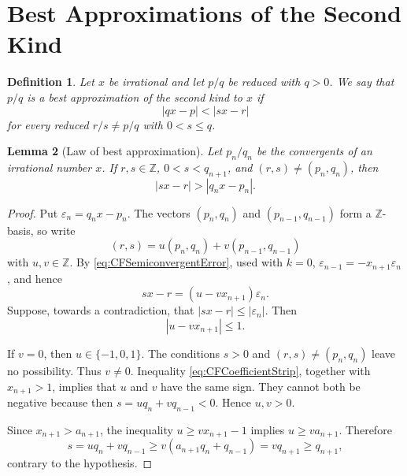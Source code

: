 \documentclass{book}
\newtheorem{definition}{Definition}[section]
\newtheorem{lemma}[definition]{Lemma}
\begin{document}
\section{Best Approximations of the Second Kind}

\begin{definition}
  Let \(x\) be irrational and let \(p/q\) be reduced with \(q>0\). We say
  that \(p/q\) is a \textnormal{best approximation of the second kind} to
  \(x\) if
  \[
    |qx-p|<|sx-r|
  \]
  for every reduced \(r/s\neq p/q\) with \(0<s\leq q\).
\end{definition}

\begin{lemma}[Law of best approximation]\label{lem:CFLawBestApproximation}
  Let \(p_n/q_n\) be the convergents of an irrational number \(x\). If
  \(r,s\in\mathbb Z\), \(0<s<q_{n+1}\), and
  \((r,s)\neq(p_n,q_n)\), then
  \begin{equation}\label{eq:CFLawBestApproximation}
    |sx-r|>|q_nx-p_n|.
  \end{equation}
\end{lemma}

\begin{proof}
  Put \(\varepsilon_n=q_nx-p_n\). The vectors
  \((p_n,q_n)\) and \((p_{n-1},q_{n-1})\) form a
  \(\mathbb Z\)-basis, so write
  \[
    (r,s)=u(p_n,q_n)+v(p_{n-1},q_{n-1})
  \]
  with \(u,v\in\mathbb Z\). By
  \eqref{eq:CFSemiconvergentError}, used with \(k=0\),
  \(\varepsilon_{n-1}=-x_{n+1}\varepsilon_n\), and hence
  \begin{equation}\label{eq:CFBasisError}
    sx-r=(u-vx_{n+1})\varepsilon_n.
  \end{equation}
  Suppose, towards a contradiction, that
  \(|sx-r|\leq|\varepsilon_n|\). Then
  \begin{equation}\label{eq:CFCoefficientStrip}
    |u-vx_{n+1}|\leq1.
  \end{equation}

  If \(v=0\), then \(u\in\{-1,0,1\}\). The conditions \(s>0\) and
  \((r,s)\neq(p_n,q_n)\) leave no possibility. Thus \(v\neq0\).
  Inequality \eqref{eq:CFCoefficientStrip}, together with
  \(x_{n+1}>1\), implies that \(u\) and \(v\) have the same sign. They
  cannot both be negative because then
  \(s=uq_n+vq_{n-1}<0\). Hence \(u,v>0\).

  Since \(x_{n+1}>a_{n+1}\), the inequality
  \(u\geq vx_{n+1}-1\) implies \(u\geq va_{n+1}\). Therefore
  \[
    s=uq_n+vq_{n-1}
      \geq v(a_{n+1}q_n+q_{n-1})
      =vq_{n+1}
      \geq q_{n+1},
  \]
  contrary to the hypothesis.
\end{proof}
\end{document}
